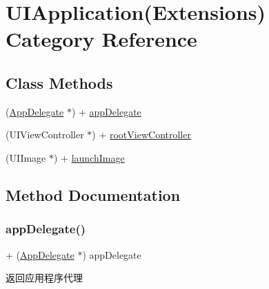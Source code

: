 \hypertarget{category_u_i_application_07_extensions_08}{}\section{U\+I\+Application(Extensions) Category Reference}
\label{category_u_i_application_07_extensions_08}
\subsection*{Class Methods}
\begin{DoxyCompactItemize}
\item 
(\mbox{\hyperlink{interface_app_delegate}{App\+Delegate}} $\ast$) + \mbox{\hyperlink{category_u_i_application_07_extensions_08_a9970a0923ff6a751916ce55a1b667302}{app\+Delegate}}
\item 
(U\+I\+View\+Controller $\ast$) + \mbox{\hyperlink{category_u_i_application_07_extensions_08_a10d15b61c29815469619a2713ac7555d}{root\+View\+Controller}}
\item 
(U\+I\+Image $\ast$) + \mbox{\hyperlink{category_u_i_application_07_extensions_08_a2e5e5ac199ea2c840f21fe0a64dc9935}{launch\+Image}}
\end{DoxyCompactItemize}


\subsection{Method Documentation}
\mbox{\label{category_u_i_application_07_extensions_08_a9970a0923ff6a751916ce55a1b667302}} 
\subsubsection{\texorpdfstring{app\+Delegate()}{appDelegate()}}
{\footnotesize\ttfamily + (\mbox{\hyperlink{interface_app_delegate}{App\+Delegate}} $\ast$) app\+Delegate \begin{DoxyParamCaption}{ }\end{DoxyParamCaption}}

返回应用程序代理 \mbox{\label{category_u_i_application_07_extensions_08_a2e5e5ac199ea2c840f21fe0a64dc9935}} 
